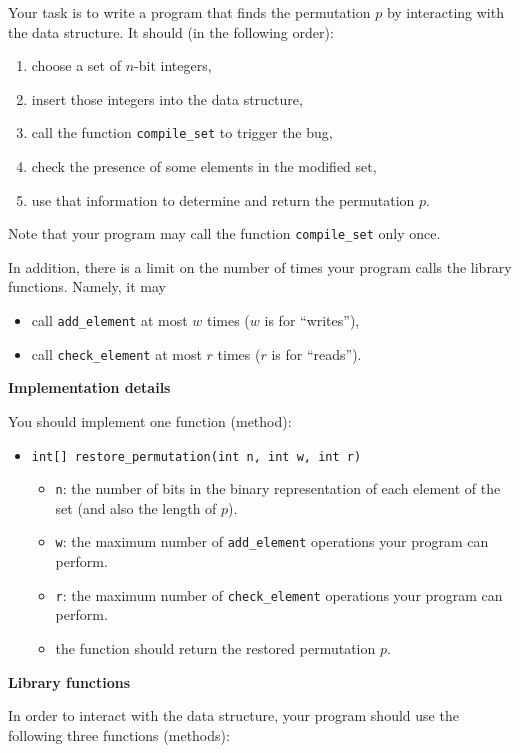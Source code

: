 Your task is to write a program that finds the permutation $p$ by interacting with the data structure. It should 
(in the following order):

\begin{enumerate}
\item choose a set of $n$-bit integers,
\item insert those integers into the data structure,
\item call the function \texttt{compile\_set} to trigger the bug,
\item check the presence of some elements in the modified set,
\item use that information to determine and return the permutation $p$.
\end{enumerate}

Note that your program may call the function \texttt{compile\_set} only once.

In addition, there is a limit on the number of times your program calls the library functions. Namely, it may
\begin{itemize}
\item call \texttt{add\_element} at most $w$ times ($w$ is for ``writes''),
\item call \texttt{check\_element} at most $r$ times ($r$ is for ``reads'').
\end{itemize}

\textbf{Implementation details}

You should implement one function (method):

\begin{itemize}\item \texttt{int[] restore\_permutation(int n, int w, int r)}
\begin{itemize}
	\item \texttt{n}: the number of bits in the binary representation of each element of the set (and also the length of $p$).
	\item \texttt{w}: the maximum number of \texttt{add\_element} operations your program can perform.
	\item \texttt{r}: the maximum number of \texttt{check\_element} operations your program can perform.
	\item the function should return the restored permutation $p$.
\end{itemize}
\end{itemize}


\textbf{Library functions}

In order to interact with the data structure, your program should use the following three functions (methods):

